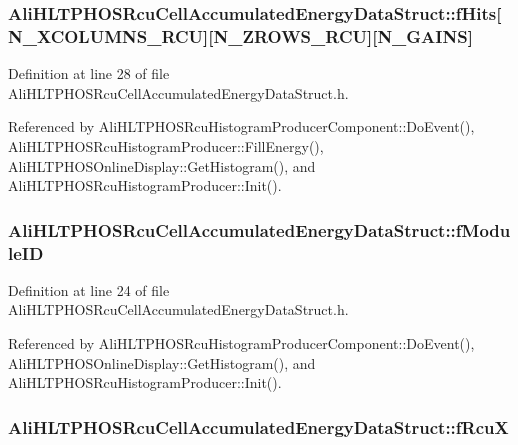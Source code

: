 \subsubsection{ {\bf Ali\-HLTPHOSRcu\-Cell\-Accumulated\-Energy\-Data\-Struct::f\-Hits}[N\_\-XCOLUMNS\_\-RCU][N\_\-ZROWS\_\-RCU][N\_\-GAINS]}\label{structAliHLTPHOSRcuCellAccumulatedEnergyDataStruct_o4}




Definition at line 28 of file Ali\-HLTPHOSRcu\-Cell\-Accumulated\-Energy\-Data\-Struct.h.

Referenced by Ali\-HLTPHOSRcu\-Histogram\-Producer\-Component::Do\-Event(), Ali\-HLTPHOSRcu\-Histogram\-Producer::Fill\-Energy(), Ali\-HLTPHOSOnline\-Display::Get\-Histogram(), and Ali\-HLTPHOSRcu\-Histogram\-Producer::Init().
\subsubsection{ {\bf Ali\-HLTPHOSRcu\-Cell\-Accumulated\-Energy\-Data\-Struct::f\-Module\-ID}}\label{structAliHLTPHOSRcuCellAccumulatedEnergyDataStruct_o0}




Definition at line 24 of file Ali\-HLTPHOSRcu\-Cell\-Accumulated\-Energy\-Data\-Struct.h.

Referenced by Ali\-HLTPHOSRcu\-Histogram\-Producer\-Component::Do\-Event(), Ali\-HLTPHOSOnline\-Display::Get\-Histogram(), and Ali\-HLTPHOSRcu\-Histogram\-Producer::Init().
\subsubsection{ {\bf Ali\-HLTPHOSRcu\-Cell\-Accumulated\-Energy\-Data\-Struct::f\-Rcu\-X}}\label{structAliHLTPHOSRcuCellAccumulatedEnergyDataStruct_o1}




